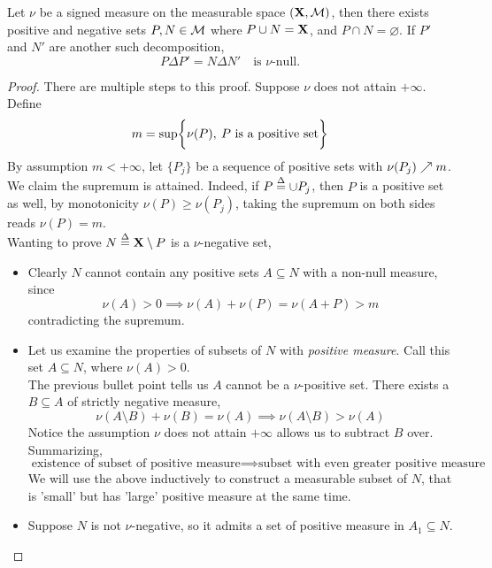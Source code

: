 \documentclass[../../main.tex]{subfiles}
\begin{document}
\begin{wts}
    Let $\nu$ be a signed measure on the measurable space $({\mathbf{X}},\mathcal{M})$, then there exists positive and negative sets $P, N\in\mathcal{M}$ where $P\cup N={\mathbf{X}}$, and $P\cap N=\varnothing$. If $P'$ and $N'$ are another such decomposition, 
    \[
        P\Delta P' = N\Delta N'\quad\text{is }\nu\text{-null.}
    \]
\end{wts}
\begin{proof}
    There are multiple steps to this proof. Suppose $\nu$ does not attain $+\infty$. Define
    \[
        m = \sup\biggl\{{\nu(P),\: P\text{ is a positive set}}\biggr\}
    \]
    By assumption $m<+\infty$, let $\{P_j\}$ be a sequence of positive sets with $\nu(P_j)\nearrow m$. We claim the supremum is attained. Indeed, if $P \overset{\Delta}{=} \cup P_j$, then $P$ is a positive set as well, by monotonicity $\nu(P)\geq \nu(P_j)$, taking the supremum on both sides reads $\nu(P)=m$.\\

    Wanting to prove $N \overset{\Delta}{=} {\mathbf{X}}\setminus P$ is a $\nu$-negative set, 
    \begin{itemize}
        \item Clearly $N$ cannot contain any positive sets $A\subseteq N$ with a non-null measure, since 
        \[
            \nu(A)>0\implies \nu(A)+\nu(P) = \nu(A+P)>m
        \]
        contradicting the supremum.
        \item Let us examine the properties of subsets of $N$ with \emph{positive measure}. Call this set $A\subseteq N$, where $\nu(A)>0$. \\
        
        The previous bullet point tells us $A$ cannot be a $\nu$-positive set. There exists a $B\subseteq A$ of strictly negative measure,
        \[
            \nu(A\setminus B) + \nu(B) = \nu(A)\implies \nu(A\setminus B) > \nu(A)
        \]
        Notice the assumption $\nu$ does not attain $+\infty$ allows us to subtract $B$ over. \\
        Summarizing, 
        \[
            \text{existence of subset of positive measure}\implies\text{subset with even greater positive measure}
        \]
        We will use the above inductively to construct a measurable subset of $N$, that is 'small' but has 'large' positive measure at the same time.
        
        \item Suppose $N$ is not $\nu$-negative, so it admits a set of positive measure in $A_1\subseteq N$.\\


\end{itemize}
\end{proof}
\end{document}
